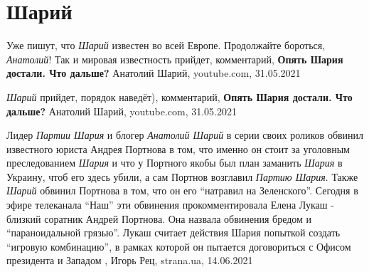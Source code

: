  
 
 
 
 
\chapter{Шарий}

Уже пишут, что \emph{Шарий} известен во всей Европе. Продолжайте  бороться, \emph{Анатолий}!  Так и мировая известность прийдет,
комментарий, \textbf{Опять Шария достали. Что дальше?} Анатолий Шарий, youtube.com, 31.05.2021

\emph{Шарий} прийдет, порядок наведёт),
комментарий, \textbf{Опять Шария достали. Что дальше?} Анатолий Шарий, youtube.com, 31.05.2021

Лидер \emph{Партии Шария} и блогер \emph{Анатолий Шарий} в серии своих роликов
обвинил известного юриста Андрея Портнова в том, что именно он стоит за
уголовным преследованием \emph{Шария} и что у Портного якобы был план заманить
\emph{Шария} в Украину, чтоб его здесь убили, а сам Портнов возглавил
\emph{Партию Шария}. Также \emph{Шарий} обвинил Портнова в том, что он его
\enquote{натравил на Зеленского}.  Сегодня в эфире телеканала \enquote{Наш} эти
обвинения прокомментировала Елена Лукаш - близкий соратник Андрей Портнова. Она
назвала обвинения бредом и \enquote{параноидальной грязью}. Лукаш считает
действия Шария попыткой создать \enquote{игровую комбинацию}, в рамках которой
он пытается договориться с Офисом президента и Западом
, 
Игорь Рец, strana.ua, 14.06.2021

